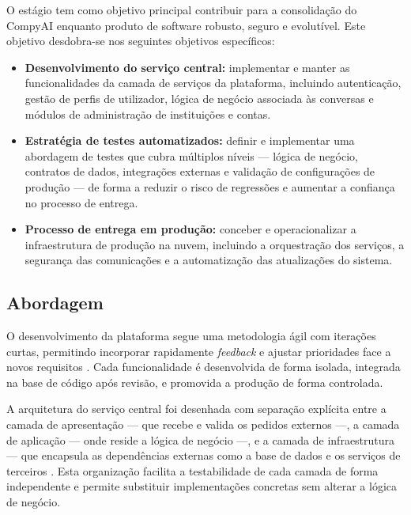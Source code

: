O estágio tem como objetivo principal contribuir para a consolidação do CompyAI enquanto
produto de software robusto, seguro e evolutível. Este objetivo desdobra-se nos seguintes
objetivos específicos:

\begin{itemize}
    \item \textbf{Desenvolvimento do serviço central:} implementar e manter as
    funcionalidades da camada de serviços da plataforma, incluindo autenticação, gestão de
    perfis de utilizador, lógica de negócio associada às conversas e módulos de administração
    de instituições e contas.

    \item \textbf{Estratégia de testes automatizados:} definir e implementar uma abordagem de
    testes que cubra múltiplos níveis — lógica de negócio, contratos de dados, integrações
    externas e validação de configurações de produção — de forma a reduzir o risco de
    regressões e aumentar a confiança no processo de entrega.

    \item \textbf{Processo de entrega em produção:} conceber e operacionalizar a
    infraestrutura de produção na nuvem, incluindo a orquestração dos serviços, a segurança
    das comunicações e a automatização das atualizações do sistema.
\end{itemize}

\subsection{Abordagem}
\label{subsec:abordagem}

O desenvolvimento da plataforma segue uma metodologia ágil com iterações curtas, permitindo
incorporar rapidamente \textit{feedback} e ajustar prioridades face a novos requisitos
\parencite{beck2001agile}. Cada funcionalidade é desenvolvida de forma isolada, integrada na
base de código após revisão, e promovida a produção de forma controlada.

A arquitetura do serviço central foi desenhada com separação explícita entre a camada de
apresentação — que recebe e valida os pedidos externos —, a camada de aplicação — onde reside
a lógica de negócio —, e a camada de infraestrutura — que encapsula as dependências externas
como a base de dados e os serviços de terceiros \parencite{martin2017clean}. Esta organização
facilita a testabilidade de cada camada de forma independente e permite substituir
implementações concretas sem alterar a lógica de negócio.

